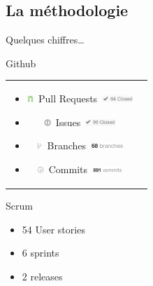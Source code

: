 \documentclass{beamer}
\begin{document}
\subsection{La méthodologie}
\begin{frame}{Quelques chiffres\ldots}
	\begin{block}{Github}
		\begin{tabular}{cc}
			\hspace{-20px}
			\begin{minipage}{0.56\textwidth}
				\begin{itemize}
					\item \includegraphics[height=10px]{images/labels/pullRequestGreen.JPG}~Pull Requests~\includegraphics[height=10px]{images/stats/pullrequest.png}
					\item \includegraphics[height=10px]{images/labels/issues.JPG}~Issues~\includegraphics[height=10px]{images/stats/issues.png}
				\end{itemize}
			\end{minipage}
			\hspace{-15px}
			\begin{minipage}{0.5\textwidth}
				\begin{itemize}
					\item \includegraphics[height=10px]{images/labels/branches.JPG}~Branches~\includegraphics[height=10px]{images/stats/branches.png}
					\item \includegraphics[height=10px]{images/labels/commits.JPG}~Commits~\includegraphics[height=10px]{images/stats/commits.png}
				\end{itemize}
			\end{minipage}
		\end{tabular}
	\end{block}
	\begin{block}{Scrum}
		\begin{itemize}
			\item 54 User stories
			\item 6 sprints
			\item 2 releases
		\end{itemize}
	\end{block}


\end{frame}
\end{document}
